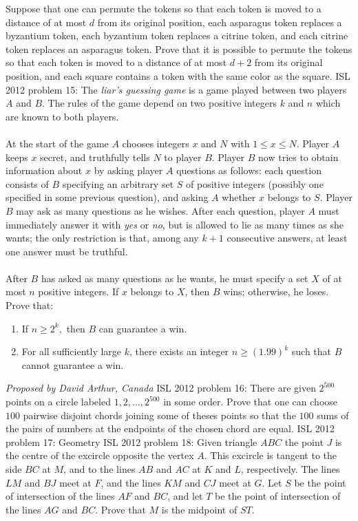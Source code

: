 Suppose that one can permute the tokens so that each token is moved to a distance of at most $d$ from its original position, each asparagus token replaces a byzantium token, each byzantium token replaces a citrine token, and each citrine token replaces an asparagus token. Prove that it is possible to permute the tokens so that each token is moved to a distance of at most $d+2$ from its original position, and each square contains a token with the same color as the square. 
ISL 2012 problem 15:  The \textit{liar's guessing game} is a game played between two players $A$ and $B$. The rules of the game depend on two positive integers $k$ and $n$ which are known to both players. \\\\
At the start of the game $A$ chooses integers $x$ and $N$ with $1 \le x \le N.$ Player $A$ keeps $x$ secret, and truthfully tells $N$ to player $B$. Player $B$ now tries to obtain information about $x$ by asking player $A$ questions as follows: each question consists of $B$ specifying an arbitrary set $S$ of positive integers (possibly one specified in some previous question), and asking $A$ whether $x$ belongs to $S$. Player $B$ may ask as many questions as he wishes. After each question, player $A$ must immediately answer it with \textit{yes} or \textit{no}, but is allowed to lie as many times as she wants; the only restriction is that, among any $k+1$ consecutive answers, at least one answer must be truthful. \\\\
After $B$ has asked as many questions as he wants, he must specify a set $X$ of at most $n$ positive integers. If $x$ belongs to $X$, then $B$ wins; otherwise, he loses. Prove that:
\begin{enumerate}
  \item If $n \ge 2^k,$ then $B$ can guarantee a win.
  \item For all sufficiently large $k$, there exists an integer $n \ge (1.99)^k$ such that $B$ cannot guarantee a win.
\end{enumerate}
\textit{Proposed by David Arthur, Canada} 
ISL 2012 problem 16:  There are given $2^{500}$ points on a circle labeled $1,2,\ldots ,2^{500}$ in some order. Prove that one can choose $100$ pairwise disjoint chords joining some of theses points so that the $100$ sums of the pairs of numbers at the endpoints of the chosen chord are equal. 
ISL 2012 problem 17:  Geometry 
ISL 2012 problem 18:  Given triangle $ABC$ the point $J$ is the centre of the excircle opposite the vertex $A.$ This excircle is tangent to the side $BC$ at $M$, and to the lines $AB$ and $AC$ at $K$ and $L$, respectively. The lines $LM$ and $BJ$ meet at $F$, and the lines $KM$ and $CJ$ meet at $G.$ Let $S$ be the point of intersection of the lines $AF$ and $BC$, and let $T$ be the point of intersection of the lines $AG$ and $BC.$ Prove that $M$ is the midpoint of $ST.$ \\\\
